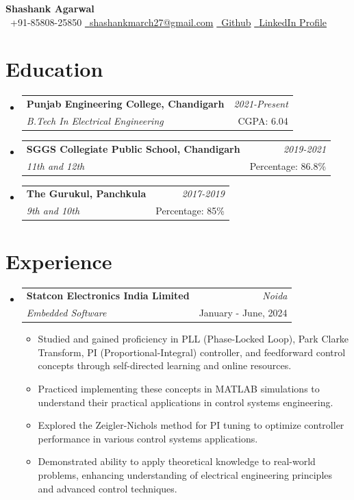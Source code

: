 \documentclass[a4paper,11pt]{article}
\makeatletter
\newcommand{\resumeSubheading}[4]{
\vspace{0.5mm}\item
    \begin{tabular*}{0.98\textwidth}[t]{l@{\extracolsep{\fill}}r}
        \textbf{#1} & \textit{\footnotesize{#4}} \\
        \textit{\footnotesize{#3}} &  \footnotesize{#2}\\
    \end{tabular*}
    \vspace{-2.4mm}
}
\newcommand{\resumeSubHeadingListStart}{\begin{itemize}[leftmargin=*,labelsep=0mm]}
\newcommand{\resumeItemListStart}{\begin{justify}\begin{itemize}[leftmargin=3ex, rightmargin=2ex, noitemsep,labelsep=1.2mm,itemsep=0mm]\small}
\newcommand{\resumeSubHeadingListEnd}{\end{itemize}\vspace{2mm}}
\newcommand{\resumeItemListEnd}{\end{itemize}\end{justify}\vspace{-2mm}}
\newcommand{\name}{Shashank Agarwal} %
\newcommand{\phone}{85808-25850} %
\newcommand{\emaila}{shashankmarch27@gmail.com} %
\makeatother
\begin{document}
\selectfont

\textbf{\huge \name} \\
\vspace{1mm}
{\raisebox{0.0\height}{\footnotesize \faPhone}\ +91-\phone} \hspace{8mm}
\href{mailto:\emaila}{\raisebox{0.0\height}{\footnotesize \faEnvelope}\ {\emaila}} \hspace{8mm}
\href{https://github.com/Witty-Wizard}{\raisebox{0.0\height}{\footnotesize \faGithub}\ {Github}} \hspace{8mm}
\href{https://www.linkedin.com/in/shashank-agarwal-pio/}{\raisebox{0.0\height}{\footnotesize \faLinkedin}\ {LinkedIn Profile}}
\vspace{-3mm}

\section{\textbf{Education}}
\resumeSubHeadingListStart
\resumeSubheading
{Punjab Engineering College, Chandigarh}{CGPA: 6.04}
{B.Tech In Electrical Engineering}{2021-Present}
\resumeSubheading
{SGGS Collegiate Public School, Chandigarh}{Percentage: 86.8\%}
{11th and 12th}{2019-2021}
\resumeSubheading
{The Gurukul, Panchkula}{Percentage: 85\%}
{9th and 10th}{2017-2019}
\resumeSubHeadingListEnd
\vspace{-5.5mm}
%

\section{\textbf{Experience}}
\resumeSubHeadingListStart
\resumeSubheading
{Statcon Electronics India Limited}{January - June, 2024}
{Embedded Software}{Noida}
\resumeItemListStart
\item{Studied and gained proficiency in PLL (Phase-Locked Loop), Park Clarke Transform, PI (Proportional-Integral) controller, and feedforward control concepts through self-directed learning and online resources.}
\item{Practiced implementing these concepts in MATLAB simulations to understand their practical applications in control systems engineering.}
\item{Explored the Zeigler-Nichols method for PI tuning to optimize controller performance in various control systems applications.}
\item{Demonstrated ability to apply theoretical knowledge to real-world problems, enhancing understanding of electrical engineering principles and advanced control techniques.}
\resumeItemListEnd
\resumeSubHeadingListEnd
\end{document}
